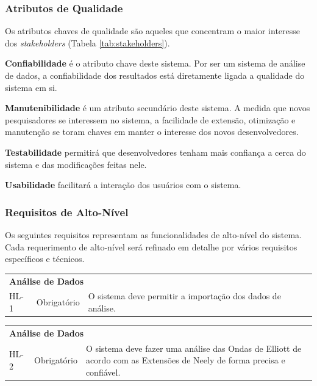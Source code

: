 \documentclass[12pt]{article}
\begin{document}
\subsubsection{Atributos de Qualidade}

Os atributos chaves de qualidade são aqueles que concentram o maior interesse dos
\textit{stakeholders} (Tabela \ref{tab:stakeholders}).

\textbf{Confiabilidade} é o atributo chave deste sistema. Por ser um sistema de análise de dados,
a confiabilidade dos resultados está diretamente ligada a qualidade do sistema em si.

\textbf{Manutenibilidade} é um atributo secundário deste sistema. A medida que novos
pesquisadores se interessem no sistema, a facilidade de extensão, otimização e manutenção
se toram chaves em manter o interesse dos novos desenvolvedores.

\textbf{Testabilidade} permitirá que desenvolvedores tenham mais confiança a cerca do sistema
e das modificações feitas nele.

\textbf{Usabilidade} facilitará a interação dos usuários com o sistema.

\subsubsection{Requisitos de Alto-Nível}

Os seguintes requisitos representam as funcionalidades de alto-nível do sistema.
Cada requerimento de alto-nível será refinado em detalhe por vários requisitos específicos
e técnicos.

\begingroup
\renewcommand*{\arraystretch}{1.5}

\centering

\begin{tabular}{|p{1cm} p{2cm} p{9cm}|}
	\hline
	\multicolumn{3}{|l|}{\textbf{Análise de Dados}}\\
	HL-1 & Obrigatório & O sistema deve permitir a importação dos dados de análise.\\
	\hline
\end{tabular}

\begin{tabular}{|p{1cm} p{2cm} p{9cm}|}
	\hline
	\multicolumn{3}{|l|}{\textbf{Análise de Dados}}\\
	HL-2 & Obrigatório & O sistema deve fazer uma análise das Ondas de Elliott de acordo com as
						 Extensões de Neely de forma precisa e confiável.\\
	\hline
\end{tabular}
\end{document}
